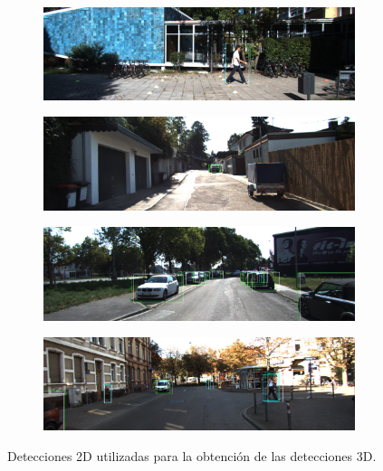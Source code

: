 \begin{figure}[H]
  \begin{subfigure}[t]{.48\textwidth}
    \centering
    \includegraphics[width=\linewidth]{Book/figures/9_completo/kitti_image_0.png}
  \end{subfigure}
  \hfill
  \begin{subfigure}[t]{.48\textwidth}
    \centering
    \includegraphics[width=\linewidth]{Book/figures/9_completo/kitti_image_1.png}
  \end{subfigure}
  \bigbreak
  \begin{subfigure}[t]{.48\textwidth}
    \centering
    \includegraphics[width=\linewidth]{Book/figures/9_completo/kitti_image_2.png}
  \end{subfigure}
  \hfill
  \begin{subfigure}[t]{.48\textwidth}
    \centering
    \includegraphics[width=\linewidth]{Book/figures/9_completo/kitti_image_3.png}
  \end{subfigure}
\caption{Detecciones 2D utilizadas para la obtención de las detecciones 3D.}
\label{fig:Detecciones 2D utilizadas para la obtención de las detecciones 3D.}
\end{figure}